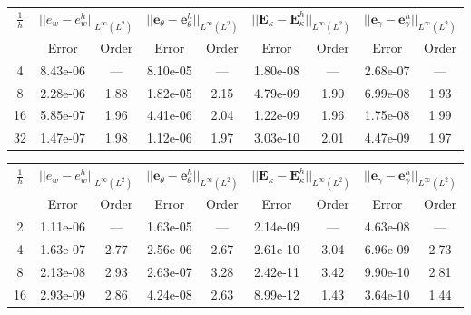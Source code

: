 \begin{table}[hp]
	\centering
	\begin{tabular}{ccccccccc}
		\hline 
		\multirow{2}{*}{$\frac{1}{h}$} & \multicolumn{2}{c}{$||e_w - e_w^h||_{L^{\infty}(L^2)}$}    & \multicolumn{2}{c}{$||\bm{e}_\theta - \bm{e}_\theta^h||_{L^{\infty}(L^2)}$} & \multicolumn{2}{c}{$||\bm{E}_\kappa - \bm{E}_\kappa^h||_{L^{\infty}(L^2)}$} & \multicolumn{2}{c}{$||\bm{e}_\gamma - \bm{e}_\gamma^ h||_{L^{\infty}(L^2)}$}   \\ 
		& Error & Order  & Error & Order  & Error & Order  & Error & Order   \\ 
		\hline 
		4  & 8.43e-06 & ---  & 8.10e-05 & ---  & 1.80e-08 & ---  & 2.68e-07 & --- \\ 
		8  & 2.28e-06 & 1.88 & 1.82e-05 & 2.15 & 4.79e-09 & 1.90 & 6.99e-08 & 1.93\\ 
		16 & 5.85e-07 & 1.96 & 4.41e-06 & 2.04 & 1.22e-09 & 1.96 & 1.75e-08 & 1.99\\ 
		32 & 1.47e-07 & 1.98 & 1.12e-06 & 1.97 & 3.03e-10 & 2.01 & 4.47e-09 & 1.97\\ 
		\hline 
	\end{tabular} 
	\captionsetup{width=0.95\linewidth}
	\vspace{1mm}
	\label{tab:resminAFW_k2}
\end{table}

\begin{table}[hp]
	\centering
	\begin{tabular}{ccccccccc}
		\hline 
		\multirow{2}{*}{$\frac{1}{h}$} & \multicolumn{2}{c}{$||e_w - e_w^h||_{L^{\infty}(L^2)}$}    & \multicolumn{2}{c}{$||\bm{e}_\theta - \bm{e}_\theta^h||_{L^{\infty}(L^2)}$} & \multicolumn{2}{c}{$||\bm{E}_\kappa - \bm{E}_\kappa^h||_{L^{\infty}(L^2)}$} & \multicolumn{2}{c}{$||\bm{e}_\gamma - \bm{e}_\gamma^ h||_{L^{\infty}(L^2)}$}   \\ 
		& Error & Order  & Error & Order  & Error & Order  & Error & Order   \\ 
		\hline 
		2  & 1.11e-06 & ---  & 1.63e-05 & ---  & 2.14e-09 & ---  & 4.63e-08 & --- \\ 
		4  & 1.63e-07 & 2.77 & 2.56e-06 & 2.67 & 2.61e-10 & 3.04 & 6.96e-09 & 2.73\\ 
		8  & 2.13e-08 & 2.93 & 2.63e-07 & 3.28 & 2.42e-11 & 3.42 & 9.90e-10 & 2.81\\ 
		16 & 2.93e-09 & 2.86 & 4.24e-08 & 2.63 & 8.99e-12 & 1.43 & 3.64e-10 & 1.44\\ 
		\hline 
	\end{tabular} 
	\captionsetup{width=0.95\linewidth}
	\vspace{1mm}
	\label{tab:resminAFW_k3}
\end{table}

